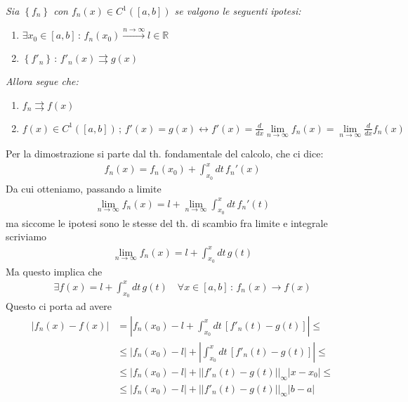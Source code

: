 \bigskip

\textit{Sia $\left\{f_n\right\}$ con $f_n(x) \in C^1([a,b])$ se valgono le seguenti ipotesi: }
\begin{enumerate}
	\item $\exists x_0 \in [a,b] \, : \, f_n(x_0) \overset{n\rightarrow \infty}{\longrightarrow} l\in \mathbb{R}$
	
	\item $\left\{f'_n\right\} \, : \, f'_n(x) \rightrightarrows g(x)$ 
\end{enumerate}

\smallskip

\textit{Allora segue che:}
\begin{enumerate}
	\item $f_n \rightrightarrows  f(x)$
	\item $f(x)\in C^1([a,b]) \, ; \, f'(x) =g(x) \leftrightarrow f'(x)= \frac{d}{dx} \underset{n\rightarrow \infty}{\lim}f_n(x)=  \underset{n\rightarrow \infty}{\lim} \frac{d}{dx}f_n(x) $
\end{enumerate}		

Per la dimostrazione si parte dal th. fondamentale del calcolo, che ci dice:
\begin{align}
	f_n(x)=f_n(x_0) + \int_{x_0}^{x} dt \, f_n'(x)
\end{align}
Da cui otteniamo, passando a limite
\begin{align}
	\underset{n\rightarrow \infty}{\lim} f_n(x)=l +  \underset{n\rightarrow \infty}{\lim}\int_{x_0}^{x} dt \, f_n'(t)
\end{align}
ma siccome le ipotesi sono le stesse del th. di scambio fra limite e integrale scriviamo
\begin{align}
	\underset{n\rightarrow \infty}{\lim} f_n(x)=l +  \int_{x_0}^{x} dt \, g(t)
\end{align}
Ma questo implica che
\begin{align}
	\exists f(x)= l +  \int_{x_0}^{x} dt \, g(t) \quad \forall x\in[a,b] \,: \, f_n(x) \longrightarrow f(x)
\end{align}
Questo ci porta ad avere
\begin{align}
	|f_n(x)- f(x)| {}&= |f_n(x_0) - l + \int_{x_0}^{x} dt \, [f'_n(t) - g(t)]| \leq \nonumber \\ 
	&\leq |f_n(x_0) - l| + |\int_{x_0}^{x} dt \, [f'_n(t) - g(t)]|\leq \nonumber \\ 
	&\leq |f_n(x_0) - l| + ||f'_n(t) - g(t)||_\infty|x-x_0| \leq \nonumber \\ 
	&\leq |f_n(x_0) - l| + ||f'_n(t) - g(t)||_\infty |b-a|
\end{align}

